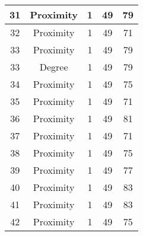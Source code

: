 \documentclass[results.tex]{subfiles}
\begin{document}
\begin{center}
\begin{tabular}{| c || c | c | c | c |}
            \hline
            31                      & Proximity                    & 1                      & 49                      & 79                   \\
            \hline
            32                      & Proximity                    & 1                      & 49                      & 71                   \\
            \hline
            33                      & Proximity                    & 1                      & 49                      & 79                   \\
            \hline
            33                      & Degree                       & 1                      & 49                      & 79                   \\
            \hline
            34                      & Proximity                    & 1                      & 49                      & 75                   \\
            \hline
            35                      & Proximity                    & 1                      & 49                      & 71                   \\
            \hline
            36                      & Proximity                    & 1                      & 49                      & 81                   \\
            \hline
            37                      & Proximity                    & 1                      & 49                      & 71                   \\
            \hline
            38                      & Proximity                    & 1                      & 49                      & 75                   \\
            \hline
            39                      & Proximity                    & 1                      & 49                      & 77                   \\
            \hline
            40                      & Proximity                    & 1                      & 49                      & 83                   \\
            \hline
            41                      & Proximity                    & 1                      & 49                      & 83                   \\
            \hline
            42                      & Proximity                    & 1                      & 49                      & 75                   \\

\end{tabular}
\end{center}
\end{document}
